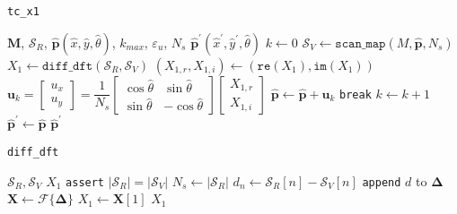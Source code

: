 \begin{algorithm}[!h]
  \caption{\texttt{tc\_x1}}
  \label{alg:icte}
  \begin{spacing}{1.4}
    \begin{algorithmic}[1]
      \REQUIRE $\bm{M}$, $\mathcal{S}_R$, $\hat{\bm{p}}(\hat{x}, \hat{y}, \hat{\theta})$, $k_{max}$, $\varepsilon_u$, $N_s$
      \ENSURE $\hat{\bm{p}}^\prime(\hat{x}^{\prime}, \hat{y}^{\prime}, \hat{\theta})$
      \STATE $k \leftarrow 0$
      \STATE $\mathcal{S}_V \leftarrow \texttt{scan\_map}(M, \hat{\bm{p}}, N_s)$
      \STATE $X_1 \leftarrow \texttt{diff\_dft}(\mathcal{S}_R, \mathcal{S}_V)$
      \STATE $(X_{1,r}, X_{1,i}) \leftarrow (\texttt{re}(X_1), \texttt{im}(X_1))$
      \STATE $\bm{u}_k = \begin{bmatrix}
              u_x \\ u_y
             \end{bmatrix}
             =
             \dfrac{1}{N_s}
             \begin{bmatrix}
               \cos\hat{\theta} & \sin\hat{\theta} \\
               \sin\hat{\theta} & -\cos\hat{\theta}
             \end{bmatrix}
             \begin{bmatrix}
               X_{1,r} \\ X_{1,i}
             \end{bmatrix}
             $
      \STATE $\hat{\bm{p}}\leftarrow \hat{\bm{p}}+ \bm{u}_k$
        \STATE \texttt{break}
      \ENDIF
      \STATE $k \leftarrow k + 1$
      \ENDWHILE
      \STATE $\hat{\bm{p}}^\prime \leftarrow \hat{\bm{p}}$
      \RETURN $\hat{\bm{p}}^\prime$
    \end{algorithmic}
  \end{spacing}
\end{algorithm}

\begin{algorithm}[!h]
  \caption{\texttt{diff\_dft}}
  \label{alg:diff_dft}
  \begin{spacing}{1.3}
    \begin{algorithmic}[1]
      \REQUIRE $\mathcal{S}_R, \mathcal{S}_V$
      \ENSURE $X_1$
      \STATE \texttt{assert} $|\mathcal{S}_R| = |\mathcal{S}_V|$
      \STATE $N_s \leftarrow |\mathcal{S}_R|$
      \STATE {$\bm{\Delta} \leftarrow \{\varnothing\}$}
      \STATE $d_n \leftarrow \mathcal{S}_R[n] - \mathcal{S}_V[n]$
      \STATE \texttt{append} $d$ to $\bm{\Delta}$
      \ENDFOR
      \STATE $\bm{X} \leftarrow \mathcal{F}\{\bm{\Delta}\}$
      \STATE $X_1 \leftarrow \bm{X}[1]$
      \RETURN $X_1$
    \end{algorithmic}
  \end{spacing}
\end{algorithm}


